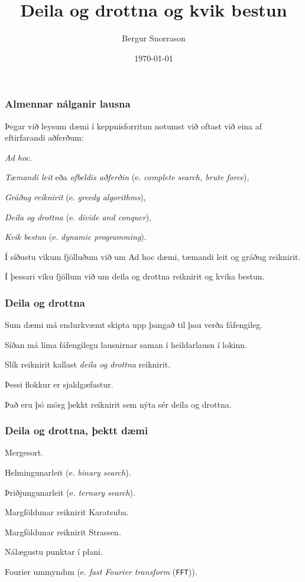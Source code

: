 

\title{Deila og drottna og kvik bestun}
\author{Bergur Snorrason}
\date{\today}



\frame{\titlepage}

{
	\frametitle{Almennar nálganir lausna}
	{
		\item<1-> Þegar við leysum dæmi í keppnisforritun notumst við oftast við eina af eftirfarandi aðferðum:
		{
			\item<2-> \emph{Ad hoc}.
			\item<3-> \emph{Tæmandi leit} eða \emph{ofbeldis aðferðin} (e. \emph{complete search, brute force}),
			\item<4-> \emph{Gráðug reiknirit} (e. \emph{greedy algorithms}),
			\item<5-> \emph{Deila og drottna} (e. \emph{divide and conquer}),
			\item<6-> \emph{Kvik bestun} (e. \emph{dynamic programming}).
		}
		\item<7-> Í síðustu vikum fjölluðum við um Ad hoc dæmi, tæmandi leit og gráðug reiknirit.
		\item<8-> Í þessari viku fjöllum við um deila og drottna reiknirit og kvika bestun.
	}
}

{
	\frametitle{Deila og drottna}
	{
		\item<1-> Sum dæmi má endurkvæmt skipta upp þangað til þau verða fáfengileg.
		\item<2-> Síðan má líma fáfengilegu lausnirnar saman í heildarlausn í lokinn.
		\item<3-> Slík reiknirit kallast \emph{deila og drottna} reiknirit.
		\item<4-> Þessi flokkur er sjaldgæfastur.
		\item<5-> Það eru þó mörg þekkt reiknirit sem nýta sér deila og drottna.
	}
}

{
	\frametitle{Deila og drottna, þektt dæmi}
	{
		\item<1-> Mergesort.
		\item<2-> Helmingunarleit (e. \emph{binary search}).
		\item<3-> Þriðjungunarleit (e. \emph{ternary search}).
		\item<4-> Margföldunar reiknirit Karatsuba.
		\item<5-> Margföldunar reiknirit Strassen.
		\item<6-> Nálægustu punktar í plani.
		\item<7-> Fourier ummyndun (e. \emph{fast Fourier transform} (\texttt{FFT})).
	}
}

